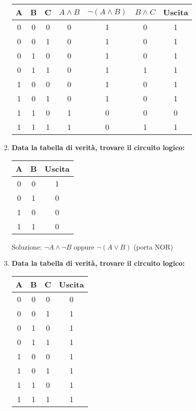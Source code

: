 \documentclass[12pt,a4paper]{article}
\begin{document}
\begin{enumerate}
    \begin{center}
    \begin{tabular}{|c|c|c||c|c|c|c|}
    \hline
    A & B & C & $A \land B$ & $\lnot(A \land B)$ & $B \land C$ & Uscita \\
    \hline
    0 & 0 & 0 & 0 & 1 & 0 & 1 \\
    0 & 0 & 1 & 0 & 1 & 0 & 1 \\
    0 & 1 & 0 & 0 & 1 & 0 & 1 \\
    0 & 1 & 1 & 0 & 1 & 1 & 1 \\
    1 & 0 & 0 & 0 & 1 & 0 & 1 \\
    1 & 0 & 1 & 0 & 1 & 0 & 1 \\
    1 & 1 & 0 & 1 & 0 & 0 & 0 \\
    1 & 1 & 1 & 1 & 0 & 1 & 1 \\
    \hline
    \end{tabular}
    \end{center}

    \item \textbf{Data la tabella di verità, trovare il circuito logico:}
    
    \begin{center}
    \begin{tabular}{|c|c|c|}
    \hline
    A & B & Uscita \\
    \hline
    0 & 0 & 1 \\
    0 & 1 & 0 \\
    1 & 0 & 0 \\
    1 & 1 & 0 \\
    \hline
    \end{tabular}
    \end{center}
    
    Soluzione: $\lnot A \land \lnot B$ oppure $\lnot(A \lor B)$ (porta NOR)

    \item \textbf{Data la tabella di verità, trovare il circuito logico:}
    
    \begin{center}
    \begin{tabular}{|c|c|c|c|}
    \hline
    A & B & C & Uscita \\
    \hline
    0 & 0 & 0 & 0 \\
    0 & 0 & 1 & 1 \\
    0 & 1 & 0 & 1 \\
    0 & 1 & 1 & 1 \\
    1 & 0 & 0 & 1 \\
    1 & 0 & 1 & 1 \\
    1 & 1 & 0 & 1 \\
    1 & 1 & 1 & 1 \\
    \hline
    \end{tabular}
    \end{center}
    

\end{enumerate}
\end{document}
